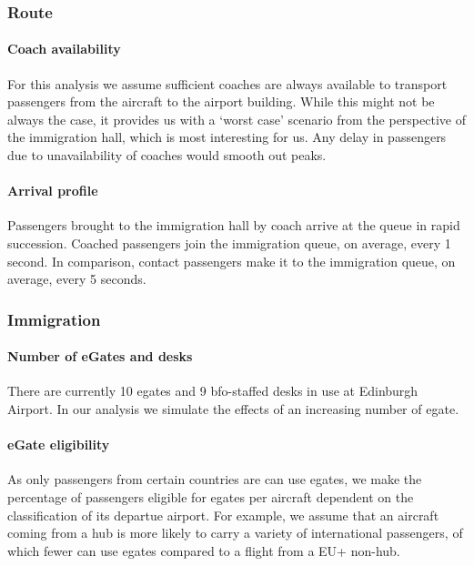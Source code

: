 \documentclass[10pt]{article}
\begin{document}
\subsubsection{Route}

\paragraph{Coach availability}
For this analysis we assume sufficient coaches are always available to transport passengers from the aircraft to the airport building. While this might not be always the case, it provides us with a `worst case' scenario from the perspective of the immigration hall, which is most interesting for us. Any delay in passengers due to unavailability of coaches would smooth out peaks.

\paragraph{Arrival profile} 
 Passengers brought to the immigration hall by coach arrive at the queue in rapid succession. Coached passengers join the immigration queue, on average, every 1 second. In comparison, contact passengers make it to the immigration queue, on average, every 5 seconds.



\subsubsection{Immigration} \label{subsec:choices_immigration}

\paragraph{Number of eGates and desks} There are currently 10 \glspl{egate} and 9 \gls{bfo}-staffed desks in use at Edinburgh Airport. In our analysis we simulate the effects of an increasing number of \gls{egate}.

\paragraph{eGate eligibility}
As only passengers from certain countries are can use \glspl{egate}, we make the percentage of passengers eligible for \glspl{egate} per aircraft dependent on the classification of its departue airport. For example, we assume that an aircraft coming from a hub is more likely to carry a variety of international passengers, of which fewer can use \glspl{egate} compared to a flight from a EU+ non-hub. 
\end{document}
